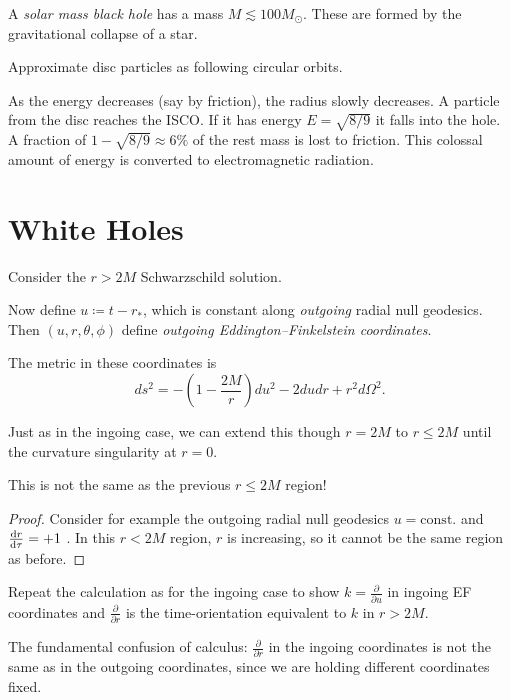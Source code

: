 
\begin{definition}[]
  A \emph{solar mass black hole} has a mass $M \lesssim 100 M_\odot$. These are formed by the gravitational collapse of a star.
\end{definition}

\begin{figure}[tbhp]
  \centering
  \def\svgwidth{0.4\columnwidth}
  
  \caption{}
  \label{fig:l5f1}
\end{figure}
Approximate disc particles as following circular orbits.

As the energy decreases (say by friction), the radius slowly decreases.
A particle from the disc reaches the ISCO. If it has energy $E = \sqrt{8 / 9}$ it falls into the hole.
A fraction of $1 - \sqrt{8 /9} \approx 6\%$ of the rest mass is lost to friction. This colossal amount of energy is converted to electromagnetic radiation.

\section{White Holes}%
\label{sec:white_holes}

Consider the $r > 2M$ Schwarzschild solution.
\begin{definition}
  Now define $u \coloneqq t - r_*$, which is constant along \emph{outgoing} radial null geodesics.
  Then $(u, r, \theta, \phi)$ define \emph{outgoing Eddington--Finkelstein coordinates}.
\end{definition}
The metric in these coordinates is
\begin{equation}
  ds^2 = - \left( 1 - \frac{2M}{r} \right) du^2 - 2du dr + r^2 d\Omega^2.
\end{equation}

Just as in the ingoing case, we can extend this though $r = 2M$ to  $r \leq 2M$  until the curvature singularity at $r = 0$.
 \begin{claim}
  This is not the same as the previous $r \leq 2M$ region!
\end{claim}
\begin{proof}
  Consider for example the outgoing radial null geodesics $u = \text{const.}$  and $\dv{r}{\tau} = +1$ .
  In this $r < 2M$ region, $r$ is increasing, so it cannot be the same region as before.
\end{proof}
\begin{exercise}
  Repeat the calculation as for the ingoing case to show $k = \frac{\partial }{\partial u}$ in ingoing EF coordinates and $\frac{\partial }{\partial r}$  is the time-orientation equivalent to $k$ in $r > 2M$.
\end{exercise}
\begin{leftbar}
  The fundamental confusion of calculus: $\frac{\partial }{\partial r}$  in the ingoing coordinates is not the same as in the outgoing coordinates, since we are holding different coordinates fixed.
\end{leftbar}


